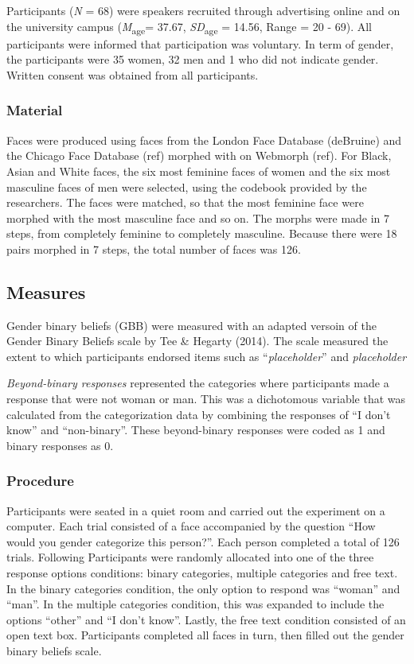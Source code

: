 \documentclass[
  man]{apa7}
\begin{document}
Participants (\emph{N} = 68) were speakers recruited through advertising online and on the university campus (\emph{M}\textsubscript{age}= 37.67, \emph{SD}\textsubscript{age} = 14.56, Range = 20 - 69). All participants were informed that participation was voluntary. In term of gender, the participants were 35 women, 32 men and 1 who did not indicate gender. Written consent was obtained from all participants.

\hypertarget{material}{%
\subsubsection{Material}\label{material}}

Faces were produced using faces from the London Face Database (deBruine) and the Chicago Face Database (ref) morphed with on Webmorph (ref). For Black, Asian and White faces, the six most feminine faces of women and the six most masculine faces of men were selected, using the codebook provided by the researchers. The faces were matched, so that the most feminine face were morphed with the most masculine face and so on. The morphs were made in 7 steps, from completely feminine to completely masculine. Because there were 18 pairs morphed in 7 steps, the total number of faces was 126.

\hypertarget{measures}{%
\subsection{Measures}\label{measures}}

Gender binary beliefs (GBB) were measured with an adapted versoin of the Gender Binary Beliefs scale by Tee \& Hegarty (2014). The scale measured the extent to which participants endorsed items such as ``\emph{placeholder}'' and \emph{placeholder}

\emph{Beyond-binary responses} represented the categories where participants made a response that were not woman or man. This was a dichotomous variable that was calculated from the categorization data by combining the responses of ``I don't know'' and ``non-binary''. These beyond-binary responses were coded as 1 and binary responses as 0.

\hypertarget{procedure}{%
\subsubsection{Procedure}\label{procedure}}

Participants were seated in a quiet room and carried out the experiment on a computer. Each trial consisted of a face accompanied by the question ``How would you gender categorize this person?''. Each person completed a total of 126 trials. Following Participants were randomly allocated into one of the three response options conditions: binary categories, multiple categories and free text. In the binary categories condition, the only option to respond was ``woman'' and ``man''. In the multiple categories condition, this was expanded to include the options ``other'' and ``I don't know''. Lastly, the free text condition consisted of an open text box. Participants completed all faces in turn, then filled out the gender binary beliefs scale.
\end{document}

